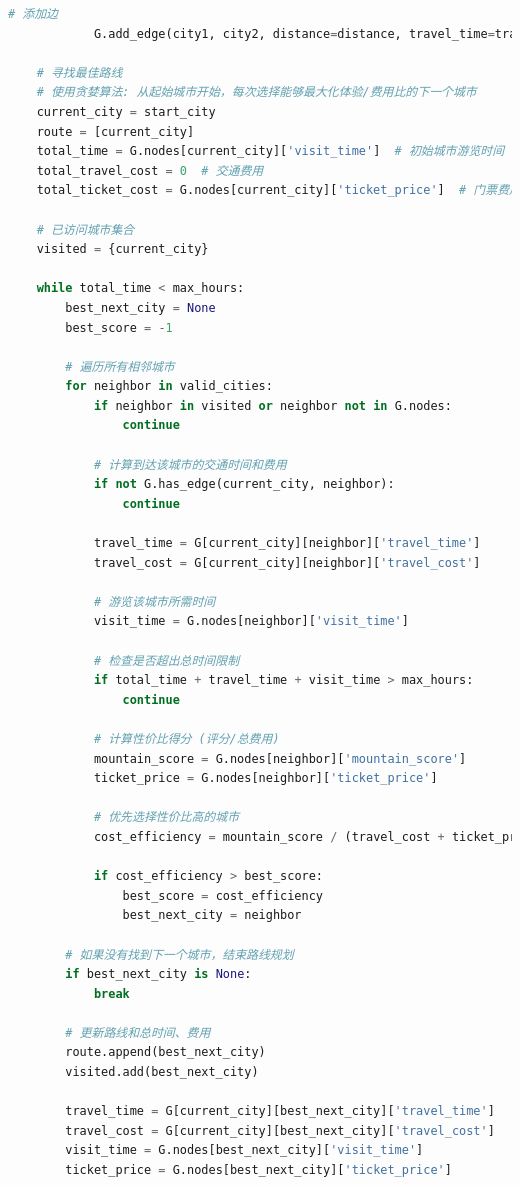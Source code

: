 \documentclass[withoutpreface,bwprint]{cumcmthesis} %
\begin{document}
\begin{appendices}
\begin{lstlisting}[language=python]
            # 添加边
            G.add_edge(city1, city2, distance=distance, travel_time=travel_time, travel_cost=travel_cost)
    
    # 寻找最佳路线
    # 使用贪婪算法: 从起始城市开始，每次选择能够最大化体验/费用比的下一个城市
    current_city = start_city
    route = [current_city]
    total_time = G.nodes[current_city]['visit_time']  # 初始城市游览时间
    total_travel_cost = 0  # 交通费用
    total_ticket_cost = G.nodes[current_city]['ticket_price']  # 门票费用
    
    # 已访问城市集合
    visited = {current_city}
    
    while total_time < max_hours:
        best_next_city = None
        best_score = -1
        
        # 遍历所有相邻城市
        for neighbor in valid_cities:
            if neighbor in visited or neighbor not in G.nodes:
                continue
                
            # 计算到达该城市的交通时间和费用
            if not G.has_edge(current_city, neighbor):
                continue
                
            travel_time = G[current_city][neighbor]['travel_time']
            travel_cost = G[current_city][neighbor]['travel_cost']
            
            # 游览该城市所需时间
            visit_time = G.nodes[neighbor]['visit_time']
            
            # 检查是否超出总时间限制
            if total_time + travel_time + visit_time > max_hours:
                continue
                
            # 计算性价比得分 (评分/总费用)
            mountain_score = G.nodes[neighbor]['mountain_score']
            ticket_price = G.nodes[neighbor]['ticket_price']
            
            # 优先选择性价比高的城市
            cost_efficiency = mountain_score / (travel_cost + ticket_price)
            
            if cost_efficiency > best_score:
                best_score = cost_efficiency
                best_next_city = neighbor
        
        # 如果没有找到下一个城市，结束路线规划
        if best_next_city is None:
            break
            
        # 更新路线和总时间、费用
        route.append(best_next_city)
        visited.add(best_next_city)
        
        travel_time = G[current_city][best_next_city]['travel_time']
        travel_cost = G[current_city][best_next_city]['travel_cost']
        visit_time = G.nodes[best_next_city]['visit_time']
        ticket_price = G.nodes[best_next_city]['ticket_price']
        

\end{lstlisting}
\end{appendices}
\end{document}
